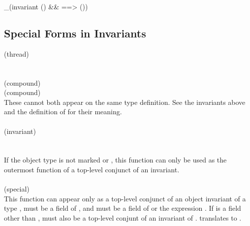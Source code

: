 \documentclass[preprint,nocopyrightspace]{sigplanconf}
\begin{document}
{{{\begin{VCC}
{  _(invariant \old(\vald) && \valid ==> \unchanged(\blobifiable))
}
\end{VCC}

\subsection{Special Forms in Invariants}

 (thread)\\
\\\\
 (compound)\\
 (compound)\\
These cannot both appear on the same type definition. See the
invariants above and the definition of  for their meaning.
\\\\
\noindent{} (invariant)\\
\\\\
If the object type is not marked 
or , this function can only be used as the
outermost function of a top-level conjunct of an invariant.
\\\\
 (special)\\
This function can appear only as a top-level conjunct of an object
invariant of a type ,  must be a field of ,
and  must be a field of  or the expression 
\vcc{\this->\owner}. If  is a field other than \vcc{\owner}, 
 must also be a top-level conjunt of an invariant
of .  translates to
. 

}}}
\end{document}

